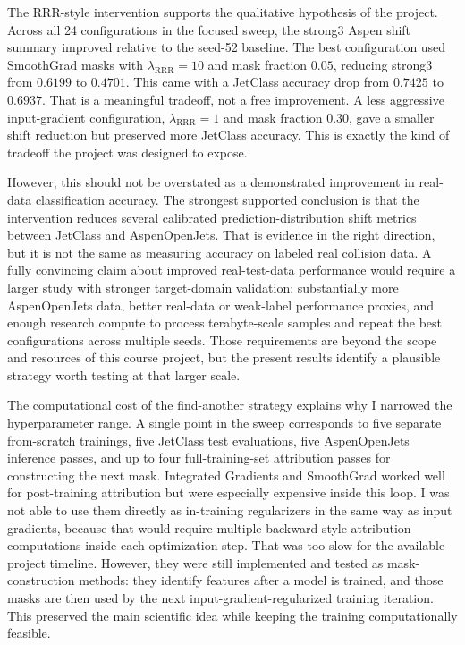 \documentclass[11pt]{article}
\begin{document}
The RRR-style intervention supports the qualitative hypothesis of the project. Across all 24 configurations in the focused sweep, the strong3 Aspen shift summary improved relative to the seed-52 baseline. The best configuration used SmoothGrad masks with $\lambda_{\mathrm{RRR}}=10$ and mask fraction $0.05$, reducing strong3 from $0.6199$ to $0.4701$. This came with a JetClass accuracy drop from $0.7425$ to $0.6937$. That is a meaningful tradeoff, not a free improvement. A less aggressive input-gradient configuration, $\lambda_{\mathrm{RRR}}=1$ and mask fraction $0.30$, gave a smaller shift reduction but preserved more JetClass accuracy. This is exactly the kind of tradeoff the project was designed to expose.

However, this should not be overstated as a demonstrated improvement in real-data classification accuracy. The strongest supported conclusion is that the intervention reduces several calibrated prediction-distribution shift metrics between JetClass and AspenOpenJets. That is evidence in the right direction, but it is not the same as measuring accuracy on labeled real collision data. A fully convincing claim about improved real-test-data performance would require a larger study with stronger target-domain validation: substantially more AspenOpenJets data, better real-data or weak-label performance proxies, and enough research compute to process terabyte-scale samples and repeat the best configurations across multiple seeds. Those requirements are beyond the scope and resources of this course project, but the present results identify a plausible strategy worth testing at that larger scale.

The computational cost of the find-another strategy explains why I narrowed the hyperparameter range. A single point in the sweep corresponds to five separate from-scratch trainings, five JetClass test evaluations, five AspenOpenJets inference passes, and up to four full-training-set attribution passes for constructing the next mask. Integrated Gradients and SmoothGrad worked well for post-training attribution but were especially expensive inside this loop. I was not able to use them directly as in-training regularizers in the same way as input gradients, because that would require multiple backward-style attribution computations inside each optimization step. That was too slow for the available project timeline. However, they were still implemented and tested as mask-construction methods: they identify features after a model is trained, and those masks are then used by the next input-gradient-regularized training iteration. This preserved the main scientific idea while keeping the training computationally feasible.
\end{document}
